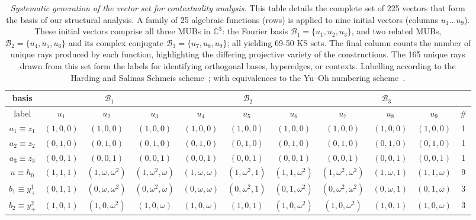 \documentclass[%
  reprint,
  superscriptaddress,
  showpacs,
  showkeys,
  amsmath,amssymb,
  pra,
  longbibliography,
  floatfix,
  x11names
]{revtex4-2}
\begin{document}
\begin{table}[htbp]
\caption{\label{tab:vector_generation}
\textit{Systematic generation of the vector set for contextuality analysis.}
This table details the complete set of 225 vectors that form the basis of our structural analysis.
A family of 25 algebraic functions (rows) is applied to nine initial vectors (columns $u_1\ldots u_9$).
These initial vectors comprise all three MUBs in $\mathbb{C}^3$:
the Fourier basis $\mathcal{B}_1 = \{u_1, u_2, u_3\}$,
and two related MUBs,
$\mathcal{B}_2 = \{u_4, u_5, u_6\}$ and its complex conjugate $\mathcal{B}_3 = \{u_7, u_8, u_9\}$; all yielding 69-50 KS sets.
The final column counts the number of unique rays produced by each function,
highlighting the differing projective variety of the constructions.
The 165 unique rays drawn from this set form the labels for identifying orthogonal bases, hyperedges, or contexts.
Labelling according to the Harding and Salinas Schmeis scheme~\cite{harding2025remarksIJTP};
with equivalences to the Yu--Oh numbering scheme~\cite{Yu-2012}.
}
\begin{ruledtabular}
\begin{tabular}{ccccccccccc}
basis&
      \multicolumn{3}{c|}{$\mathcal{B}_1$}&
      \multicolumn{3}{c|}{$\mathcal{B}_2$}&
      \multicolumn{3}{c}{$\mathcal{B}_3$}\\
\hline
label & $u_{1}$ & $u_{2}$ & $u_{3}$ & $u_{4}$ & $u_{5}$ & $u_{6}$ & $u_{7}$ & $u_{8}$ & $u_{9}$ & \#  \\ \hline
$a_1\equiv z_1$ & $(1,0,0)$ & $(1,0,0)$ & $(1,0,0)$ & $(1,0,0)$ & $(1,0,0)$ & $(1,0,0)$ & $(1,0,0)$ & $(1,0,0)$ & $(1,0,0)$ & 1 \\
$a_2\equiv z_2$ & $(0,1,0)$ & $(0,1,0)$ & $(0,1,0)$ & $(0,1,0)$ & $(0,1,0)$ & $(0,1,0)$ & $(0,1,0)$ & $(0,1,0)$ & $(0,1,0)$ & 1 \\
$a_3\equiv z_3$ & $(0,0,1)$ & $(0,0,1)$ & $(0,0,1)$ & $(0,0,1)$ & $(0,0,1)$ & $(0,0,1)$ & $(0,0,1)$ & $(0,0,1)$ & $(0,0,1)$ & 1 \\
$u\equiv h_0$ & $(1,1,1)$ & $(1,\omega,\omega^2)$ & $(1,\omega^2,\omega)$ & $(1,\omega,\omega)$ & $(1,\omega^2,1)$ & $(1,1,\omega^2)$ & $(1,\omega^2,\omega^2)$ & $(1,\omega,1)$ & $(1,1,\omega)$ & 9 \\
$b_1\equiv y_+^1$ & $(0,1,1)$ & $(0,\omega,\omega^2)$ & $(0,\omega^2,\omega)$ & $(0,\omega,\omega)$ & $(0,\omega^2,1)$ & $(0,1,\omega^2)$ & $(0,\omega^2,\omega^2)$ & $(0,\omega,1)$ & $(0,1,\omega)$ & 3 \\
$b_2\equiv y_+^2$ & $(1,0,1)$ & $(1,0,\omega^2)$ & $(1,0,\omega)$ & $(1,0,\omega)$ & $(1,0,1)$ & $(1,0,\omega^2)$ & $(1,0,\omega^2)$ & $(1,0,1)$ & $(1,0,\omega)$ & 3 \\

\end{tabular}
\end{ruledtabular}
\end{table}
\end{document}
